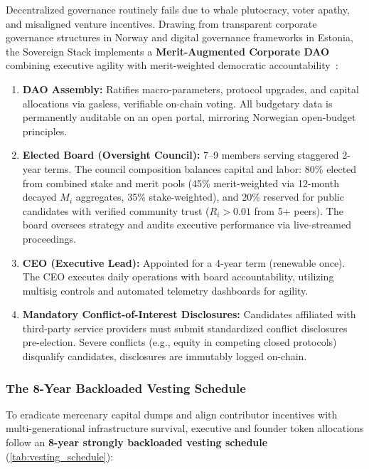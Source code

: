 \documentclass[a4paper,11pt,twoside,parskip=half-,headings=small]{scrartcl}
\begin{document}
Decentralized governance routinely fails due to whale plutocracy, voter apathy, and misaligned venture incentives. Drawing from transparent corporate governance structures in Norway and digital governance frameworks in Estonia, the Sovereign Stack implements a \textbf{Merit-Augmented Corporate DAO} combining executive agility with merit-weighted democratic accountability~\cite{blum2024lightbook,blum2024vision}:
\begin{enumerate}[nosep]
  \item \textbf{DAO Assembly:} Ratifies macro-parameters, protocol upgrades, and capital allocations via gasless, verifiable on-chain voting. All budgetary data is permanently auditable on an open portal, mirroring Norwegian open-budget principles.
  \item \textbf{Elected Board (Oversight Council):} 7--9 members serving staggered 2-year terms. The council composition balances capital and labor: 80\% elected from combined stake and merit pools (45\% merit-weighted via 12-month decayed $M_i$ aggregates, 35\% stake-weighted), and 20\% reserved for public candidates with verified community trust ($R_i > 0.01$ from 5+ peers). The board oversees strategy and audits executive performance via live-streamed proceedings.
  \item \textbf{CEO (Executive Lead):} Appointed for a 4-year term (renewable once). The CEO executes daily operations with board accountability, utilizing multisig controls and automated telemetry dashboards for agility.
  \item \textbf{Mandatory Conflict-of-Interest Disclosures:} Candidates affiliated with third-party service providers must submit standardized conflict disclosures pre-election. Severe conflicts (e.g., equity in competing closed protocols) disqualify candidates, disclosures are immutably logged on-chain.
\end{enumerate}

\subsubsection{The 8-Year Backloaded Vesting Schedule}

To eradicate mercenary capital dumps and align contributor incentives with multi-generational infrastructure survival, executive and founder token allocations follow an \textbf{8-year strongly backloaded vesting schedule} (\cref{tab:vesting_schedule}):
\end{document}
